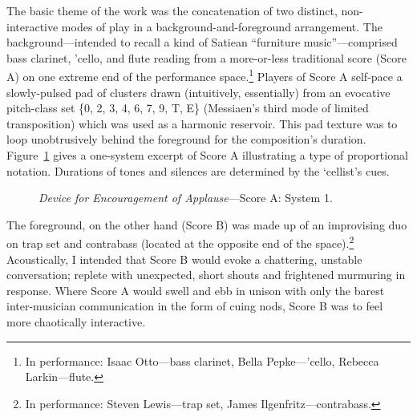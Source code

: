     The basic theme of the work was the concatenation of two distinct, non-interactive modes of play in a background-and-foreground arrangement. The background---intended to recall a kind of Satiean ``furniture music''---comprised bass clarinet, 'cello, and flute reading from a more-or-less traditional score (Score A) on one extreme end of the performance space.\footnote{In performance: Isaac Otto---bass clarinet, Bella Pepke---'cello, Rebecca Larkin---flute.} Players of Score A self-pace a slowly-pulsed pad of clusters drawn (intuitively, essentially) from an evocative pitch-class set \{0, 2, 3, 4, 6, 7, 9, T, E\} (Messiaen's third mode of limited transposition) which was used as a harmonic reservoir. This pad texture was to loop unobtrusively behind the foreground for the composition's duration. Figure~\ref{fig:encouragementA} gives a one-system excerpt of Score A illustrating a type of proportional notation. Durations of tones and silences are determined by the `cellist's cues.

    \begin{figure}
        \centering
        \captionsetup{width=.5\textwidth}
        \caption{\textit{Device for Encouragement of Applause}---Score A: System 1.}
        \label{fig:encouragementA}
    \end{figure}
    
    \noindent The foreground, on the other hand (Score B) was made up of an improvising duo on trap set and contrabass (located at the opposite end of the space).\footnote{In performance: Steven Lewis---trap set, James Ilgenfritz---contrabass.} Acoustically, I intended that Score B would evoke a chattering, unstable conversation; replete with unexpected, short shouts and frightened murmuring in response. Where Score A would swell and ebb in unison with only the barest inter-musician communication in the form of cuing nods, Score B was to feel more chaotically interactive.
    

